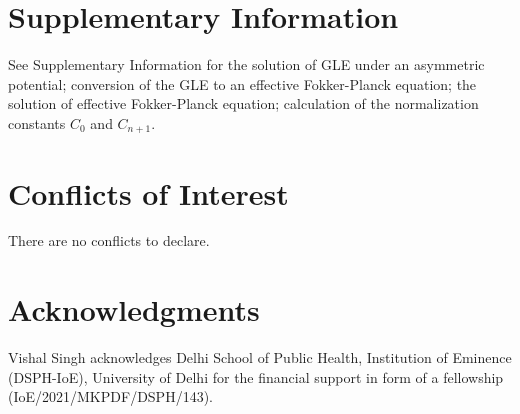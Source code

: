 \documentclass[twoside,twocolumn,9pt]{article}
\begin{document}
\section*{Supplementary Information}
See Supplementary Information for
the solution of GLE under an asymmetric potential; 
conversion of the GLE to an effective Fokker-Planck equation;
the solution of effective Fokker-Planck equation;   
calculation of the normalization constants ${C_0}$ and ${C_{n+1}}$.

\section*{Conflicts of Interest}
There are no conflicts to declare.

\section*{Acknowledgments}
Vishal Singh acknowledges Delhi School of Public Health, Institution of Eminence (DSPH-IoE), 
University of Delhi for the financial support in form of a fellowship (IoE/2021/MKPDF/DSPH/143).

 
 
\end{document}
